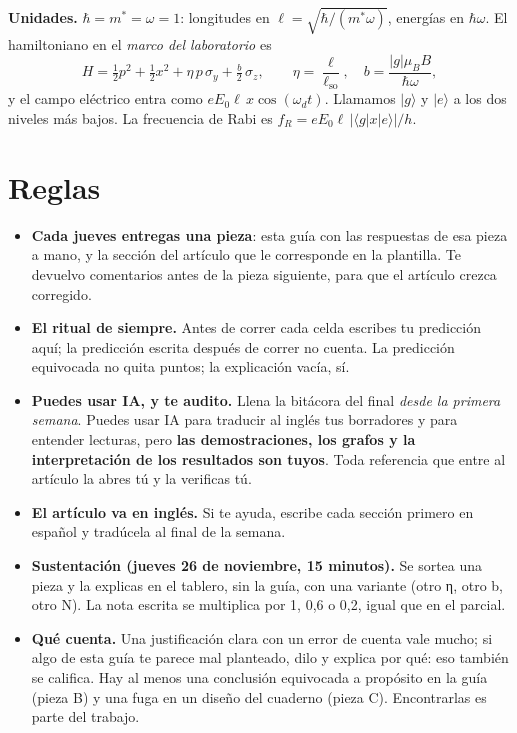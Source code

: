 \textbf{Unidades.} $\hbar = m^* = \omega = 1$: longitudes en $\ell = \sqrt{\hbar/(m^*\omega)}$, energías en $\hbar\omega$. El hamiltoniano en el \emph{marco del laboratorio} es
\[ H = \tfrac12 p^2 + \tfrac12 x^2 + \eta\, p\,\sigma_y + \tfrac{b}{2}\,\sigma_z, \qquad \eta = \frac{\ell}{\ell_{\mathrm{so}}}, \quad b = \frac{|g|\mu_B B}{\hbar\omega}, \]
y el campo eléctrico entra como $eE_0\ell\, x\cos(\omega_d t)$. Llamamos $|g\rangle$ y $|e\rangle$ a los dos niveles más bajos. La frecuencia de Rabi es $f_R = eE_0\ell\,|\langle g|x|e\rangle|/h$.

\section{Reglas}

\begin{itemize}
\tightlist
\item \textbf{Cada jueves entregas una pieza}: esta guía con las respuestas de esa pieza a mano, y la sección del artículo que le corresponde en la plantilla. Te devuelvo comentarios antes de la pieza siguiente, para que el artículo crezca corregido.
\item \textbf{El ritual de siempre.} Antes de correr cada celda escribes tu predicción aquí; la predicción escrita después de correr no cuenta. La predicción equivocada no quita puntos; la explicación vacía, sí.
\item \textbf{Puedes usar IA, y te audito.} Llena la bitácora del final \emph{desde la primera semana}. Puedes usar IA para traducir al inglés tus borradores y para entender lecturas, pero \textbf{las demostraciones, los grafos y la interpretación de los resultados son tuyos}. Toda referencia que entre al artículo la abres tú y la verificas tú.
\item \textbf{El artículo va en inglés.} Si te ayuda, escribe cada sección primero en español y tradúcela al final de la semana.
\item \textbf{Sustentación (jueves 26 de noviembre, 15 minutos).} Se sortea una pieza y la explicas en el tablero, sin la guía, con una variante (otro η, otro b, otro N). La nota escrita se multiplica por 1, 0,6 o 0,2, igual que en el parcial.
\item \textbf{Qué cuenta.} Una justificación clara con un error de cuenta vale mucho; si algo de esta guía te parece mal planteado, dilo y explica por qué: eso también se califica. Hay al menos una conclusión equivocada a propósito en la guía (pieza B) y una fuga en un diseño del cuaderno (pieza C). Encontrarlas es parte del trabajo.
\end{itemize}

